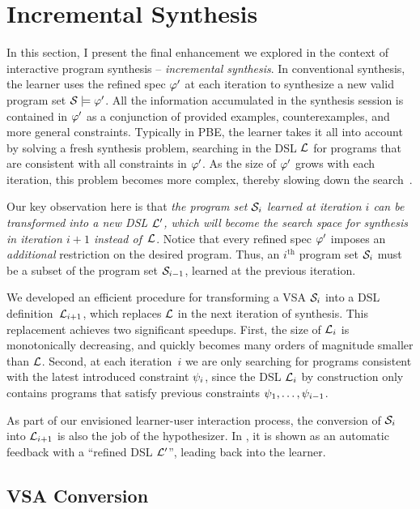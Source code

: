 \section{Incremental Synthesis}
\label{sec:interactive:incremental}

In this section, I present the final enhancement we explored in the context of interactive program synthesis --
\emph{incremental synthesis}.
In conventional synthesis, the learner uses the refined spec $\varphi'$ at each iteration to synthesize a new valid
program set $\mathcal{S} \models \varphi'$.
All the information accumulated in the synthesis session is contained in $\varphi'$ as a conjunction of provided examples,
counterexamples, and more general constraints.
Typically in PBE, the learner takes it all into account by solving a fresh synthesis problem, searching in the DSL
$\mathcal{L}$ for programs that are consistent with all constraints in $\varphi'$.
As the size of $\varphi'$ grows with each iteration, this problem becomes more complex, thereby slowing down the
search~\cite{bitvectors}.

Our key observation here is that \emph{the program set $\mathcal{S}_i$ learned at iteration $i$ can be transformed into a new
    DSL $\mathcal{L}'$, which will become the search space for synthesis in iteration $i+1$ instead of~$\mathcal{L}$}.
Notice that every refined spec $\varphi'$ imposes an \emph{additional} restriction on the desired program.
Thus, an $i^{\text{th}}$ program set $\mathcal{S}_i$ must be a subset of the program set $\mathcal{S}_{i-1}$, learned at the previous
iteration.

We developed an efficient procedure for transforming a VSA $\mathcal{S}_i$ into a DSL definition~$\mathcal{L}_{i+1}$, which replaces
$\mathcal{L}$ in the next iteration of synthesis.
This replacement achieves two significant speedups.
First, the size of $\mathcal{L}_i$ is monotonically decreasing, and quickly becomes many orders of magnitude smaller than
$\mathcal{L}$.
Second, at each iteration~$i$ we are only searching for programs consistent with the latest introduced constraint
$\psi_i$, since the DSL $\mathcal{L}_i$ by construction only contains programs that satisfy previous constraints
$\psi_1, \dots, \psi_{i-1}$.

As part of our envisioned learner-user interaction process, the conversion of $\mathcal{S}_i$ into $\mathcal{L}_{i+1}$ is also the job
of the hypothesizer.
In , it is shown as an automatic feedback with a ``refined DSL $\mathcal{L}'$'', leading back
into the learner.

\subsection{VSA Conversion}

